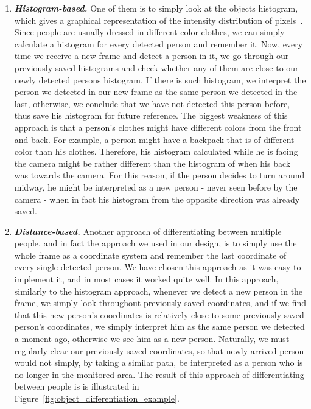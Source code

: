 \begin{enumerate}
\item \textit{\textbf{Histogram-based.}} One of them is to simply look at the objects histogram, which gives a graphical representation of the intensity distribution of pixels~\cite{histogram_1}. Since people are usually dressed in different color clothes, we can simply calculate a histogram for every detected person and remember it. Now, every time we receive a new frame and detect a person in it, we go through our previously saved histograms and check whether any of them are close to our newly detected persons histogram. If there is such histogram, we interpret the person we detected in our new frame as the same person we detected in the last, otherwise, we conclude that we have not detected this person before, thus save his histogram for future reference. The biggest weakness of this approach is that a person's clothes might have different colors from the front and back. For example, a person might have a backpack that is of different color than his clothes. Therefore, his histogram calculated while he is facing the camera might be rather different than the histogram of when his back was towards the camera. For this reason, if the person decides to turn around midway, he might be interpreted as a new person - never seen before by the camera - when in fact his histogram from the opposite direction was already saved. 

\item \textit{\textbf{Distance-based.}} Another approach of differentiating between multiple people, and in fact the approach we used in our design, is to simply use the whole frame as a coordinate system and remember the last coordinate of every single detected person. We have chosen this approach as it was easy to implement it, and in most cases it worked quite well. In this approach, similarly to the histogram approach, whenever we detect a new person in the frame, we simply look throughout previously saved coordinates, and if we find that this new person's coordinates is relatively close to some previously saved person's coordinates, we simply interpret him as the same person we detected a moment ago, otherwise we see him as a new person. Naturally, we must regularly clear our previously saved coordinates, so that newly arrived person would not simply, by taking a similar path, be interpreted as a person who is no longer in the monitored area. The result of this approach of differentiating between people is is illustrated in Figure~\ref{fig:object_differentiation_example}.
\end{enumerate}
	
